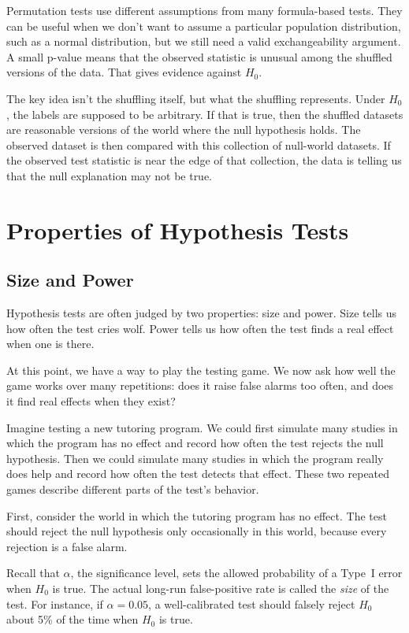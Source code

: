 Permutation tests use different assumptions from many formula-based
tests. They can be useful when we don't want to assume a particular
population distribution, such as a normal distribution, but we still
need a valid exchangeability argument. A small
p-value means that the observed statistic is unusual among the shuffled
versions of the data. That gives evidence against $H_0$.

The key idea isn't the shuffling itself, but what the shuffling
represents. Under $H_0$, the labels are supposed to be arbitrary. If
that is true, then the shuffled datasets are reasonable versions of the
world where the null hypothesis holds. The observed dataset is then
compared with this collection of null-world datasets. If the observed
test statistic is near the edge of that collection, the data is
telling us that the null explanation may not be true.


\section{Properties of Hypothesis Tests}

\subsection{Size and Power}

Hypothesis tests are often judged by two properties: size and power.
Size tells us how often the test cries wolf. Power tells us how often
the test finds a real effect when one is there.

At this point, we have a way to play the testing game. We now ask how
well the game works over many repetitions: does it raise false alarms
too often, and does it find real effects when they exist?

Imagine testing a new tutoring program. We could first simulate many
studies in which the program has no effect and record how often the
test rejects the null hypothesis. Then we could simulate many studies
in which the program really does help and record how often the test
detects that effect. These two repeated games describe different parts
of the test's behavior.

First, consider the world in which the tutoring program has no effect.
The test should reject the null hypothesis only occasionally in this
world, because every rejection is a false alarm.

Recall that $\alpha$, the significance level, sets the allowed
probability of a Type~I error when $H_0$ is true. The actual long-run
false-positive rate is called the \emph{size} of the test. For
instance, if $\alpha = 0.05$, a well-calibrated test should falsely
reject $H_0$ about 5\% of the time when $H_0$ is true.

